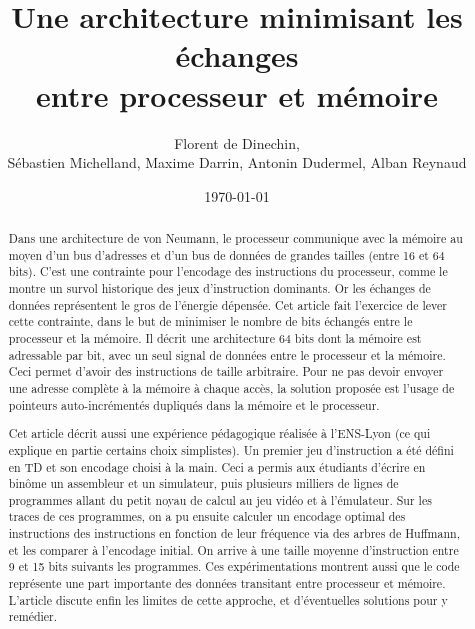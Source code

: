 \documentclass[architecture]{compas2018}
\begin{document}
\title{Une architecture minimisant les échanges\\ entre processeur et mémoire}

\author{Florent de Dinechin, \\Sébastien Michelland, Maxime Darrin, Antonin Dudermel, Alban Reynaud}

\address{
}

\date{\today}

\maketitle

\begin{abstract}
Dans une architecture de von Neumann, le processeur communique avec la mémoire au moyen d'un bus d'adresses et d'un bus de données de grandes tailles (entre 16 et 64 bits).
C'est une contrainte pour l'encodage des instructions du processeur, comme le montre un survol historique des jeux d'instruction dominants.
Or les échanges de données représentent le gros de l'énergie dépensée.
Cet article fait l'exercice de lever cette contrainte, dans le but de minimiser le nombre de bits échangés entre le processeur et la mémoire.
Il décrit une architecture 64 bits dont la mémoire est adressable par bit, avec un seul signal de données entre le processeur et la mémoire.
Ceci permet d'avoir des instructions de taille arbitraire.
Pour ne pas devoir envoyer une adresse complète à la mémoire à chaque accès, la solution proposée est l'usage de pointeurs auto-incrémentés dupliqués dans la mémoire et le processeur.

Cet article décrit aussi une expérience pédagogique réalisée à l'ENS-Lyon (ce qui explique en partie certains choix simplistes).
Un premier jeu d'instruction a été défini en TD et son encodage choisi à la main.
Ceci a permis aux étudiants d'écrire en binôme un assembleur et un simulateur, puis plusieurs milliers de lignes de programmes allant du petit noyau de calcul au jeu vidéo et à l'émulateur.
Sur les traces de ces programmes, on a pu ensuite calculer un encodage optimal des instructions des instructions en fonction de leur fréquence via des arbres de Huffmann, et les comparer à l'encodage initial.
On arrive à une taille moyenne d'instruction entre 9 et 15 bits suivants les programmes.
 Ces expérimentations montrent aussi que le code représente une part importante des données transitant entre processeur et mémoire. 
 L'article discute enfin les limites de cette approche, et d'éventuelles solutions pour y remédier.
\end{abstract}
\end{document}
